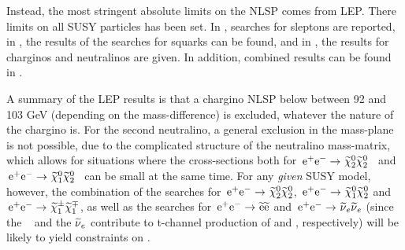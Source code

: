 Instead,
the most stringent absolute limits on the NLSP comes from LEP.
There
limits on all SUSY particles has been set.
In
\cite{Abdallah:2003xe,Heister:2001nk,Achard:2003ge,Abbiendi:2003ji},
searches for sleptons are reported, in 
\cite{Abdallah:2003xe,Achard:2003ge,Heister:2002hp,Abbiendi:2002mp},
the results of the searches for squarks can be found, 
and in \cite{Abdallah:2003xe,Abbiendi:2003sc,Heister:2002mn,Acciarri:1999km},
the results for charginos and neutralinos are given.
In addition,
combined results can be found in \cite{
LEPSUSYWG/04-01.1,*LEPSUSYWG/04-02.1,*LEPSUSYWG/02-04.1,*LEPSUSYWG/01-03.1}.

A summary of the LEP results is that 
a chargino NLSP below
between 92 and 103 GeV
(depending on the mass-difference) is excluded,
whatever the nature of the chargino is.
For the second neutralino,
a general exclusion in the mass-plane is not possible,
due to the complicated structure of the neutralino mass-matrix,
which allows for situations where the cross-sections both for
$\mbox{$ {\, \mathrm e}^+ {\mathrm e}^- \to $}~\mbox{$ \widetilde{\chi}^0_2 $} \mbox{$ \widetilde{\chi}^0_2 $}$~ and $\mbox{$ {\, \mathrm e}^+ {\mathrm e}^- \to $}~\mbox{$ \widetilde{\chi}^0_1 $} \mbox{$ \widetilde{\chi}^0_2 $}$~ can be small
at the same time. 
For any {\it given} SUSY model, however, the combination of the
searches for $\mbox{$ {\, \mathrm e}^+ {\mathrm e}^- \to $}~\mbox{$ \widetilde{\chi}^0_2 $} \mbox{$ \widetilde{\chi}^0_2 $}$, $\mbox{$ {\, \mathrm e}^+ {\mathrm e}^- \to $}~\mbox{$ \widetilde{\chi}^0_1 $} \mbox{$ \widetilde{\chi}^0_2 $}$ and
$\mbox{$ {\, \mathrm e}^+ {\mathrm e}^- \to $}~\mbox{$ \widetilde{\chi}^{\pm}_1 $} \mbox{$ \widetilde{\chi}^{\mp}_1 $}$, 
as well as the searches for $\mbox{$ {\, \mathrm e}^+ {\mathrm e}^- \to $}~\mbox{$ \widetilde{\mathrm e} $} \mbox{$ \widetilde{\mathrm e} $}$ and $\mbox{$ {\, \mathrm e}^+ {\mathrm e}^- \to $}~\mbox{$ \widetilde\nu $}_e \mbox{$ \widetilde\nu $}_e$ 
(since the \sel~ and the $\mbox{$ \widetilde\nu $}_e$ contribute to t-channel production of  and , 
respectively) 
will be likely to yield constraints on .

